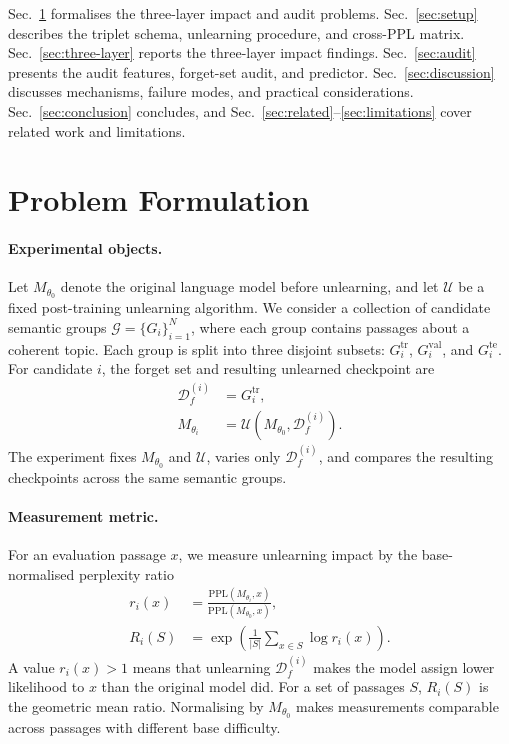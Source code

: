 \documentclass[11pt]{article}
\newcommand{\Df}{\mathcal{D}_f}
\newcommand{\PPL}{\mathrm{PPL}}
\begin{document}
Sec.~\ref{sec:problem} formalises the three-layer impact and audit problems.
Sec.~\ref{sec:setup} describes the triplet schema, unlearning procedure, and
cross-PPL matrix. Sec.~\ref{sec:three-layer} reports the three-layer impact
findings. Sec.~\ref{sec:audit} presents the audit features, forget-set audit,
and predictor. Sec.~\ref{sec:discussion} discusses mechanisms, failure modes,
and practical considerations. Sec.~\ref{sec:conclusion} concludes, and
Sec.~\ref{sec:related}--\ref{sec:limitations} cover related work and
limitations.

\section{Problem Formulation}
\label{sec:problem}

\paragraph{Experimental objects.}
Let $M_{\theta_0}$ denote the original language model before unlearning, and
let $\mathcal{U}$ be a fixed post-training unlearning algorithm. We consider a
collection of candidate semantic groups
$\mathcal{G}=\{G_i\}_{i=1}^{N}$, where each group contains passages about a
coherent topic. Each group is split into three disjoint subsets:
$G_i^{\mathrm{tr}}$, $G_i^{\mathrm{val}}$, and $G_i^{\mathrm{te}}$. For
candidate $i$, the forget set and resulting unlearned checkpoint are
\begin{align}
    \Df^{(i)} &= G_i^{\mathrm{tr}},\\
    M_{\theta_i} &= \mathcal{U}(M_{\theta_0}, \Df^{(i)}).
\end{align}
The experiment fixes $M_{\theta_0}$ and $\mathcal{U}$, varies only
$\Df^{(i)}$, and compares the resulting checkpoints across the same semantic
groups.

\paragraph{Measurement metric.}
For an evaluation passage $x$, we measure unlearning impact by the
base-normalised perplexity ratio
\begin{align}
    r_i(x)
    &=
    \frac{\PPL(M_{\theta_i}, x)}
         {\PPL(M_{\theta_0}, x)},\\
    R_i(S)
    &=
    \exp\!\left(
    \frac{1}{|S|}\sum_{x\in S}\log r_i(x)
    \right).
\end{align}
A value $r_i(x)>1$ means that unlearning $\Df^{(i)}$ makes the model assign
lower likelihood to $x$ than the original model did. For a set of passages
$S$, $R_i(S)$ is the geometric mean ratio. Normalising by $M_{\theta_0}$ makes
measurements comparable across
passages with different base difficulty.
\end{document}
